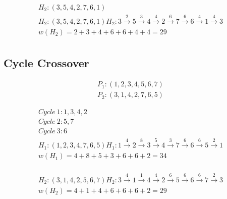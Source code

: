 \documentclass{article}
\begin{document}
\begin{equation*}
  \begin{split}
    H_2: (3,5,\boxed{4,2,7},6,1)\\
    H_2: (3,5,4,2,7,6,1) H_2: 3 \overset{2}{\rightarrow} 5 \overset{3}{\rightarrow} 4 \overset{4}{\rightarrow} 2 \overset{6}{\rightarrow} 7 \overset{6}{\rightarrow} 6 \overset{4}{\rightarrow} 1 \overset{4}{\rightarrow} 3\\
    w(H_2) = 2 + 3 + 4 + 6 + 6 + 4 + 4 = 29\\
  \end{split}
\end{equation*}

\subsection{Cycle Crossover}
\begin{equation*}
  \begin{split}
    P_1: (1,2,3,4,5,6,7)\\
    P_2: (3,1,4,2,7,6,5)
  \end{split}
\end{equation*}

\begin{equation*}
  \begin{split}
    Cycle\ 1: 1,3,4,2\\
    Cycle\ 2: 5,7\\
    Cycle\ 3: 6\\
    H_1: (1,2,3,4,7,6,5) H_1: 1 \overset{4}{\rightarrow} 2 \overset{8}{\rightarrow} 3 \overset{5}{\rightarrow} 4 \overset{3}{\rightarrow} 7 \overset{6}{\rightarrow} 6 \overset{6}{\rightarrow} 5 \overset{2}{\rightarrow} 1\\
    w(H_1) = 4 + 8 + 5 + 3 + 6 + 6 + 2 = 34\\
  \end{split}
\end{equation*}

\begin{equation*}
  \begin{split}
    H_2: (3,1,4,2,5,6,7) H_2: 3 \overset{4}{\rightarrow} 1 \overset{1}{\rightarrow} 4 \overset{4}{\rightarrow} 2 \overset{6}{\rightarrow} 5 \overset{6}{\rightarrow} 6 \overset{6}{\rightarrow} 7 \overset{2}{\rightarrow} 3\\
    w(H_2) = 4 + 1 + 4 + 6 + 6 + 6 + 2= 29\\
  \end{split}
\end{equation*}
\end{document}
